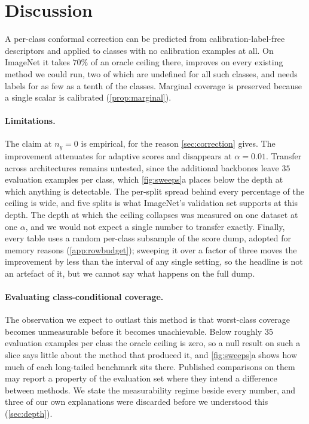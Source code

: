 \section{Discussion}
\label{sec:discussion}

A per-class conformal correction can be predicted from calibration-label-free descriptors and
applied to classes with no calibration examples at all. On ImageNet it takes $70\%$ of an
oracle ceiling there, improves on every existing method we could run, two of which are
undefined for all such classes, and needs labels for as few as a tenth of the classes.
Marginal coverage is preserved because a single scalar is calibrated
(\cref{prop:marginal}).

\paragraph{Limitations.} The claim at $n_y=0$ is empirical, for the reason
\cref{sec:correction} gives. The improvement attenuates for adaptive scores and disappears at
$\alpha=0.01$. Transfer across architectures remains
untested, since the additional backbones leave $35$ evaluation examples per class, which
\cref{fig:sweeps}a places below the depth at which anything is detectable.
The per-split spread behind every percentage of the ceiling is wide, and five splits is
what ImageNet's validation set supports at this depth. The depth at which the ceiling
collapses was measured on one dataset at one $\alpha$, and we would not expect a single number
to transfer exactly. Finally, every table uses a
random per-class subsample of the score dump, adopted for memory reasons
(\cref{app:rowbudget}); sweeping it over a factor of three moves the improvement by less than
the interval of any single setting, so the headline is not an artefact of it, but we cannot
say what happens on the full dump.

\paragraph{Evaluating class-conditional coverage.} The observation we expect to outlast this
method is that worst-class coverage becomes unmeasurable before it becomes unachievable. Below
roughly $35$ evaluation examples per class the oracle ceiling is zero, so a null result on such
a slice says little about the method that produced it, and \cref{fig:sweeps}a shows how much of
each long-tailed benchmark sits there. Published comparisons on them may report a property of
the evaluation set where they intend a difference between methods. We state the measurability
regime beside every number, and three of our own explanations were discarded before we
understood this (\cref{sec:depth}).

